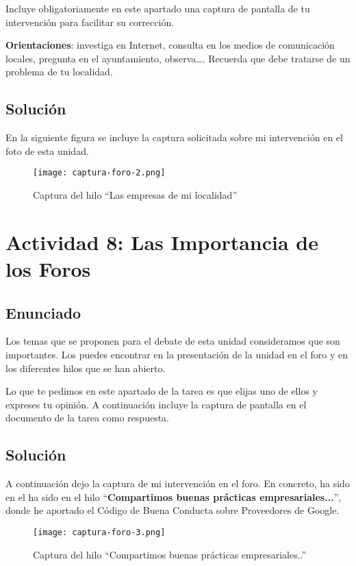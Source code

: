 Incluye obligatoriamente en este apartado una captura de pantalla de tu intervención para facilitar su corrección.

\textbf{Orientaciones}: investiga en Internet, consulta en los medios de comunicación locales, pregunta en el ayuntamiento, observa…. Recuerda que debe tratarse de un problema de tu localidad.

\subsection{Solución}
En la siguiente figura se incluye la captura solicitada sobre mi intervención en el foto de esta unidad.

\begin{figure}[H]
    \centering
    \texttt{[image: captura-foro-2.png]}
    \caption{Captura del hilo ``Las empresas de mi localidad''}
\end{figure}

\section{Actividad 8: Las Importancia de los Foros}
\subsection{Enunciado}
Los temas que se proponen para el debate de esta unidad consideramos que son importantes. Los puedes encontrar en la presentación de la unidad en el foro y en los diferentes hilos que se han abierto.

Lo que te pedimos en este apartado de la tarea es que elijas uno de ellos y expreses tu opinión. A continuación incluye la captura de pantalla en el documento de la tarea como respuesta.

\subsection{Solución}
A continuación dejo la captura de mi intervención en el foro. En concreto, ha sido en el ha sido en el hilo ``\textbf{Compartimos buenas prácticas empresariales...}'', donde he aportado el Código de Buena Conducta sobre Proveedores de Google.

\begin{figure}[H]
    \centering
    \texttt{[image: captura-foro-3.png]}
    \caption{Captura del hilo ``Compartimos buenas prácticas empresariales..''}
\end{figure}

